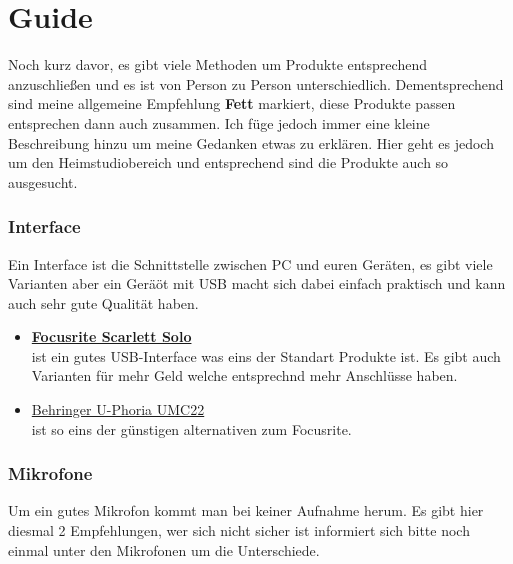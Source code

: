 
\newpage
\chapter{Guide} \label{Hardewareguide}

Noch kurz davor, es gibt viele Methoden um Produkte entsprechend anzuschließen und es ist von Person zu Person unterschiedlich. Dementsprechend sind meine allgemeine Empfehlung \textbf{Fett} markiert, diese Produkte passen entsprechen dann auch zusammen. Ich füge jedoch immer eine kleine Beschreibung hinzu um meine Gedanken etwas zu erklären. Hier geht es jedoch um den Heimstudiobereich und entsprechend sind die Produkte auch so ausgesucht. 

\subsection{Interface}
Ein Interface ist die Schnittstelle zwischen PC und euren Geräten, es gibt viele Varianten aber ein Geräöt mit USB macht sich dabei einfach praktisch und kann auch sehr gute Qualität haben.\\

\begin{itemize}
    \item \textbf{\href{https://www.thomann.de/de/focusrite_scarlett_solo_3rd_gen.htm}{Focusrite Scarlett Solo}}\\
    ist ein gutes USB-Interface was eins der Standart Produkte ist. Es gibt auch Varianten für mehr Geld welche entsprechnd mehr Anschlüsse haben.
    \item \href{https://www.thomann.de/de/behringer_u_phoria_umc22.htm}{Behringer U-Phoria UMC22}\\ ist so eins der günstigen alternativen zum Focusrite.
\end{itemize}

\subsection{Mikrofone}
Um ein gutes Mikrofon kommt man bei keiner Aufnahme herum. Es gibt hier diesmal 2 Empfehlungen, wer sich nicht sicher ist informiert sich bitte noch einmal unter den Mikrofonen um die Unterschiede. \\

